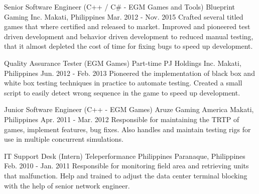 \begin{cventries}
    \cventry
        {Senior Software Engineer (C++ / C# - EGM Games and Tools)}
        {Blueprint Gaming Inc.}
        {Makati, Philippines}
        {Mar. 2012 - Nov. 2015}
        {Crafted several titled games that where certified and released to market. Improved and pioneered test driven development and behavior driven development to reduced manual testing, that it almost depleted the cost of time for fixing bugs to speed up development.}
        
    \cventry
        {Quality Assurance Tester (EGM Games) Part-time}
        {PJ Holdings Inc.}
        {Makati, Philippines}
        {Jun. 2012 - Feb. 2013}
        {Pioneered the implementation of black box and white box testing techniques in practice to automate testing. Created a small script to easily detect wrong sequence in the game to speed up development.}
        
    \cventry
        {Junior Software Engineer (C++ - EGM Games)}
        {Aruze Gaming America}
        {Makati, Philippines}
        {Apr. 2011 - Mar. 2012}
        {Responsible for maintaining the TRTP of games, implement features, bug fixes. Also handles and maintain testing rigs for use in multiple concurrent simulations.}

    \cventry
        {IT Support Desk (Intern)}
        {Teleperformance Philippines}
        {Paranaque, Philippines}
        {Feb. 2010 - Jan. 2011}
        {Responsible for monitoring field area and retrieving units that malfunction. Help and trained to adjust the data center terminal blocking with the help of senior network engineer.}

\end{cventries}